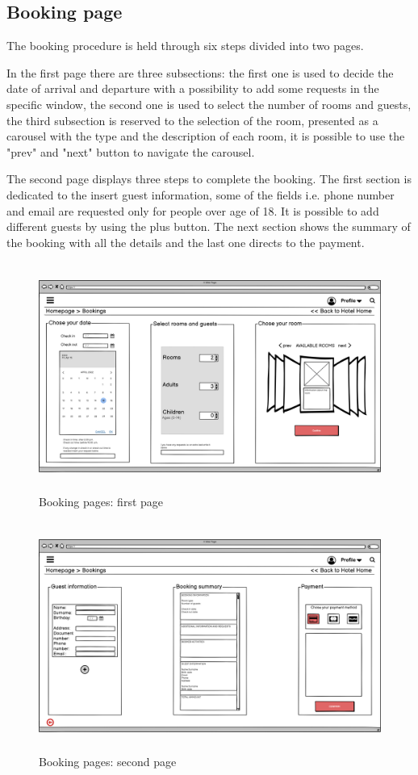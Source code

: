 \subsection{Booking page}
The booking procedure is held through six steps divided into two pages. 
\par \noindent In the first page there are three subsections: the first one is used to decide the date of arrival and departure with a possibility to add some requests in the specific window, the second one is used to select the number of rooms and guests, the third subsection is reserved to the selection of the room, presented as a carousel with the type and the description of each room, it is possible to use the "prev" and "next" button to navigate the carousel.
\par \noindent The second page displays three steps to complete the booking. The first section is dedicated to the insert guest information, some of the fields i.e. phone number and email are requested only for people over age of 18. It is possible to add different guests by using the plus button. The next section shows the summary of the booking with all the details and the last one directs to the payment. 

\begin{figure}[H]
	\centering
	\includegraphics[height=7.5cm]{images/Booking.png} 
	\caption{Booking pages: first page}
\end{figure}
\begin{figure}[H]
	\centering
	\includegraphics[height=7.5cm]{images/booking_2.png} 
	\caption{Booking pages: second page}
\end{figure}